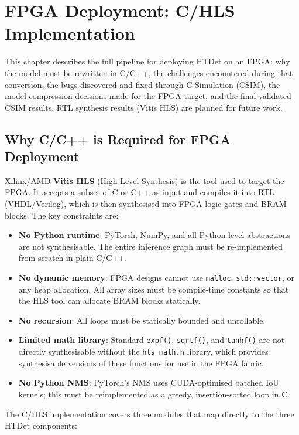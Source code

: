 \chapter{FPGA Deployment: C/HLS Implementation}

This chapter describes the full pipeline for deploying HTDet on an FPGA: why the model must be rewritten in C/C++, the challenges encountered during that conversion, the bugs discovered and fixed through C-Simulation (CSIM), the model compression decisions made for the FPGA target, and the final validated CSIM results. RTL synthesis results (Vitis HLS) are planned for future work.

\section{Why C/C++ is Required for FPGA Deployment}

Xilinx/AMD \textbf{Vitis HLS} (High-Level Synthesis) is the tool used to target the FPGA. It accepts a subset of C or C++ as input and compiles it into RTL (VHDL/Verilog), which is then synthesised into FPGA logic gates and BRAM blocks. The key constraints are:

\begin{itemize}
    \item \textbf{No Python runtime}: PyTorch, NumPy, and all Python-level abstractions are not synthesisable. The entire inference graph must be re-implemented from scratch in plain C/C++.
    \item \textbf{No dynamic memory}: FPGA designs cannot use \texttt{malloc}, \texttt{std::vector}, or any heap allocation. All array sizes must be compile-time constants so that the HLS tool can allocate BRAM blocks statically.
    \item \textbf{No recursion}: All loops must be statically bounded and unrollable.
    \item \textbf{Limited math library}: Standard \texttt{expf()}, \texttt{sqrtf()}, and \texttt{tanhf()} are not directly synthesisable without the \texttt{hls\_math.h} library, which provides synthesisable versions of these functions for use in the FPGA fabric.
    \item \textbf{No Python NMS}: PyTorch's NMS uses CUDA-optimised batched IoU kernels; this must be reimplemented as a greedy, insertion-sorted loop in C.
\end{itemize}

The C/HLS implementation covers three modules that map directly to the three HTDet components:

